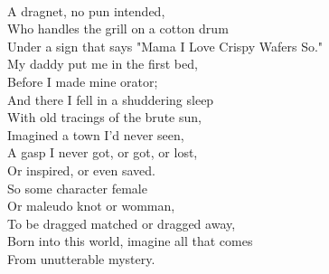 \documentclass[smalldemyvopaper,11pt,twoside,onecolumn,openright,extrafontsizes]{memoir}
\begin{document}
\\A dragnet, no pun intended,
\\Who handles the grill on a cotton drum
\\Under a sign that says "Mama I Love Crispy Wafers So."
\\My daddy put me in the first bed,
\\Before I made mine orator;
\\And there I fell in a shuddering sleep
\\With old tracings of the brute sun,
\\Imagined a town I'd never seen,
\\A gasp I never got, or got, or lost,
\\Or inspired, or even saved.
\\So some character female
\\Or maleudo knot or womman,
\\To be dragged matched or dragged away,
\\Born into this world, imagine all that comes
\\From unutterable mystery.
\end{document}
